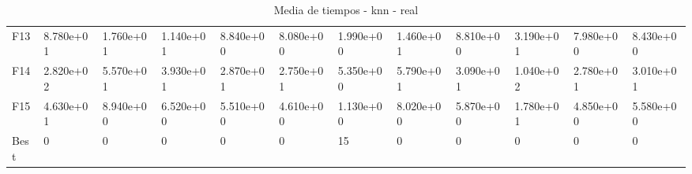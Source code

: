 \begin{table}
\begin{adjustbox}{width=\linewidth}
\begin{tabular}{llllllllllll}
            F13  & 8.780e+01 & 1.760e+01 & 1.140e+01 & 8.840e+00 & 8.080e+00 & 1.990e+00 & 1.460e+01 & 8.810e+00 & 3.190e+01 & 7.980e+00 & 8.430e+00 \\
            F14  & 2.820e+02 & 5.570e+01 & 3.930e+01 & 2.870e+01 & 2.750e+01 & 5.350e+00 & 5.790e+01 & 3.090e+01 & 1.040e+02 & 2.780e+01 & 3.010e+01 \\
            F15  & 4.630e+01 & 8.940e+00 & 6.520e+00 & 5.510e+00 & 4.610e+00 & 1.130e+00 & 8.020e+00 & 5.870e+00 & 1.780e+01 & 4.850e+00 & 5.580e+00 \\
            Best & 0         & 0         & 0         & 0         & 0         & 15        & 0         & 0         & 0         & 0         & 0         \\
            \bottomrule
        \end{tabular}
    \end{adjustbox}
    \caption{Media de tiempos - knn - real}
    \label{tab:mean_time_knn_real}
\end{table}

